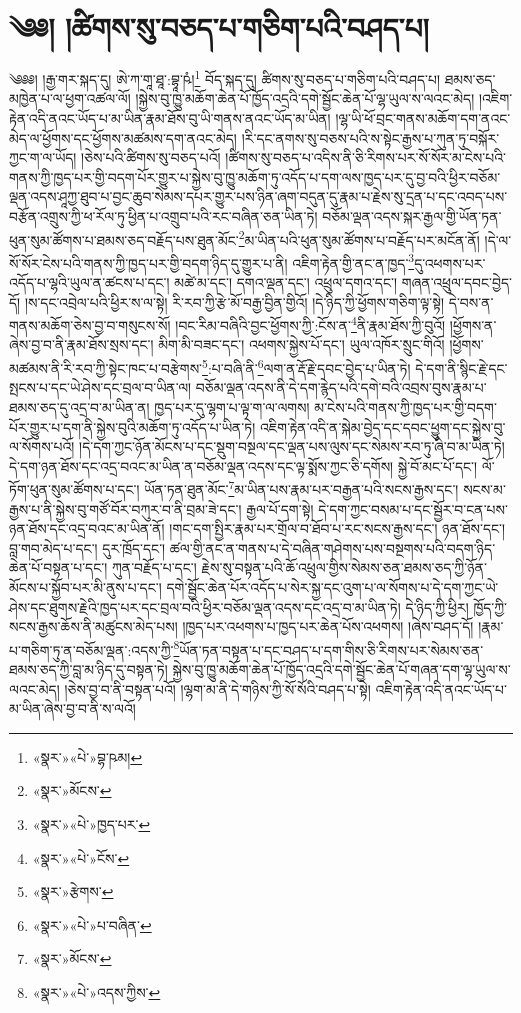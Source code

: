 \chapter{༄༅། །ཚིགས་སུ་བཅད་པ་གཅིག་པའི་བཤད་པ།}༄༅༅། །རྒྱ་གར་སྐད་དུ། ཨེ་ཀ་གཱ་ཐཱ་:བྷཱ་ཥཾ།\footnote{«སྣར་»«པེ་»བྷ་ཥམ།} བོད་སྐད་དུ། ཚིགས་སུ་བཅད་པ་གཅིག་པའི་བཤད་པ། ཐམས་ཅད་མཁྱེན་པ་ལ་ཕྱག་འཚལ་ལོ། །སྐྱེས་བུ་ཁྱུ་མཆོག་ཆེན་པོ་ཁྱོད་འདྲའི་དགེ་སྦྱོང་ཆེན་པོ་ལྷ་ཡུལ་ས་ལའང་མེད། །འཇིག་རྟེན་འདི་ནའང་ཡོད་པ་མ་ཡིན་རྣམ་ཐོས་བུ་ཡི་གནས་ནའང་ཡོད་མ་ཡིན། །ལྷ་ཡི་ཕོ་བྲང་གནས་མཆོག་དག་ནའང་མེད་ལ་ཕྱོགས་དང་ཕྱོགས་མཚམས་དག་ནའང་མེད། །རི་དང་ནགས་སུ་བཅས་པའི་ས་སྟེང་རྒྱས་པ་ཀུན་ཏུ་བསྐོར་ཀྱང་ག་ལ་ཡོད། །ཅེས་པའི་ཚིགས་སུ་བཅད་པའོ། །ཚིགས་སུ་བཅད་པ་འདིས་ནི་ཅི་རིགས་པར་སོ་སོར་མ་ངེས་པའི་གནས་ཀྱི་ཁྱད་པར་གྱི་བདག་པོར་གྱུར་པ་སྐྱེས་བུ་ཁྱུ་མཆོག་ཏུ་འདོད་པ་དག་ལས་ཁྱད་པར་དུ་བྱ་བའི་ཕྱིར་བཅོམ་ལྡན་འདས་ཤཱཀྱ་ཐུབ་པ་བྱང་ཆུབ་སེམས་དཔར་གྱུར་པས་ཉིན་ཞག་བདུན་དུ་རྣམ་པ་རྗེས་སུ་དྲན་པ་དང་འབད་པས་བརྩོན་འགྲུས་ཀྱི་ཕ་རོལ་ཏུ་ཕྱིན་པ་འགྲུབ་པའི་རང་བཞིན་ཅན་ཡིན་ཏེ། བཅོམ་ལྡན་འདས་སྐར་རྒྱལ་གྱི་ཡོན་ཏན་ཕུན་སུམ་ཚོགས་པ་ཐམས་ཅད་བརྗོད་པས་ཐུན་མོང་\footnote{«སྣར་»མོངས་}མ་ཡིན་པའི་ཕུན་སུམ་ཚོགས་པ་བརྗོད་པར་མངོན་ནོ། །དེ་ལ་སོ་སོར་ངེས་པའི་གནས་ཀྱི་ཁྱད་པར་གྱི་བདག་ཉིད་དུ་གྱུར་པ་ནི། འཇིག་རྟེན་གྱི་ནང་ན་ཁྱད་\footnote{«སྣར་»«པེ་»ཁྱད་པར་}དུ་འཕགས་པར་འདོད་པ་ལྷའི་ཡུལ་ན་ཚངས་པ་དང་། མཚེ་མ་དང་། དགའ་ལྡན་དང་། འཕྲུལ་དགའ་དང་། གཞན་འཕྲུལ་དབང་བྱེད་དོ། །ས་དང་འབྲེལ་པའི་ཕྱིར་ས་ལ་སྟེ། རི་རབ་ཀྱི་རྩེ་མོ་བརྒྱ་བྱིན་གྱིའོ། །དེ་ཉིད་ཀྱི་ཕྱོགས་གཅིག་ལྟ་སྟེ། དེ་བས་ན་གནས་མཆོག་ཅེས་བྱ་བ་གསུངས་སོ། །བང་རིམ་བཞིའི་བྱང་ཕྱོགས་ཀྱི་:ངོས་ན་\footnote{«སྣར་»«པེ་»ངོས་}ནི་རྣམ་ཐོས་ཀྱི་བུའོ། །ཕྱོགས་ན་ཞེས་བྱ་བ་ནི་རྣམ་ཐོས་སྲས་དང་། མིག་མི་བཟང་དང་། འཕགས་སྐྱེས་པོ་དང་། ཡུལ་འཁོར་སྲུང་གིའོ། །ཕྱོགས་མཚམས་ནི་རི་རབ་ཀྱི་སྟེང་ཁང་པ་བརྩེགས་\footnote{«སྣར་»རྩེགས་}:པ་བཞི་ནི་\footnote{«སྣར་»«པེ་»པ་བཞིན་}ལག་ན་རྡོ་རྗེ་དབང་བྱེད་པ་ཡིན་ཏེ། དེ་དག་ནི་སྙིང་རྗེ་དང་སྤངས་པ་དང་ཡེ་ཤེས་དང་བྲལ་བ་ཡིན་ལ། བཅོམ་ལྡན་འདས་ནི་དེ་དག་རྙེད་པའི་དགེ་བའི་འབྲས་བུས་རྣམ་པ་ཐམས་ཅད་དུ་འདྲ་བ་མ་ཡིན་ན། ཁྱད་པར་དུ་ལྷག་པ་ལྟ་ག་ལ་ལགས། མ་ངེས་པའི་གནས་ཀྱི་ཁྱད་པར་གྱི་བདག་པོར་གྱུར་པ་དག་ནི་སྐྱེས་བུའི་མཆོག་ཏུ་འདོད་པ་ཡིན་ཏེ། འཇིག་རྟེན་འདི་ན་སྐེམ་བྱེད་དང་དབང་ཕྱུག་དང་སྐྱེས་བུ་ལ་སོགས་པའོ། །དེ་དག་ཀྱང་ཉོན་མོངས་པ་དང་སྡུག་བསྔལ་དང་ལྡན་པས་ལུས་དང་སེམས་རབ་ཏུ་ཞི་བ་མ་ཡིན་ཏེ། དེ་དག་ཉན་ཐོས་དང་འདྲ་བའང་མ་ཡིན་ན་བཅོམ་ལྡན་འདས་དང་ལྟ་སྨོས་ཀྱང་ཅི་དགོས། སྐྱེ་བོ་མང་པོ་དང་། ལོ་ཏོག་ཕུན་སུམ་ཚོགས་པ་དང་། ཡོན་ཏན་ཐུན་མོང་\footnote{«སྣར་»མོངས་}མ་ཡིན་པས་རྣམ་པར་བརྒྱན་པའི་སངས་རྒྱས་དང་། སངས་མ་རྒྱས་པ་ནི་སྐྱེས་བུ་གཙོ་བོར་བཀུར་བ་ནི་བྲམ་ཟེ་དང་། རྒྱལ་པོ་དག་སྟེ། དེ་དག་ཀྱང་བསམ་པ་དང་སྦྱོར་བ་ངན་པས་ཉན་ཐོས་དང་འདྲ་བའང་མ་ཡིན་ནོ། །གང་དག་སྤྱིར་རྣམ་པར་གྲོལ་བ་ཐོབ་པ་རང་སངས་རྒྱས་དང་། ཉན་ཐོས་དང་། བླ་གབ་མེད་པ་དང་། དུར་ཁྲོད་དང་། ཚལ་གྱི་ནང་ན་གནས་པ་དེ་བཞིན་གཤེགས་པས་བསྔགས་པའི་བདག་ཉིད་ཆེན་པོ་བསྟན་པ་དང་། ཀུན་བརྗོད་པ་དང་། རྗེས་སུ་བསྟན་པའི་ཆོ་འཕྲུལ་གྱིས་སེམས་ཅན་ཐམས་ཅད་ཀྱི་ཉོན་མོངས་པ་སྐྱོབ་པར་མི་ནུས་པ་དང་། དགེ་སྦྱོང་ཆེན་པོར་འདོད་པ་སེར་སྐྱ་དང་འུག་པ་ལ་སོགས་པ་དེ་དག་ཀྱང་ཡེ་ཤེས་དང་ཐུགས་རྗེའི་ཁྱད་པར་དང་བྲལ་བའི་ཕྱིར་བཅོམ་ལྡན་འདས་དང་འདྲ་བ་མ་ཡིན་ཏེ། དེ་ཉིད་ཀྱི་ཕྱིར། ཁྱོད་ཀྱི་སངས་རྒྱས་ཆོས་ནི་མཚུངས་མེད་པས། །ཁྱད་པར་འཕགས་པ་ཁྱད་པར་ཆེན་པོས་འཕགས། །ཞེས་བཤད་དོ། །རྣམ་པ་གཅིག་ཏུ་ན་བཅོམ་ལྡན་:འདས་ཀྱི་\footnote{«སྣར་»«པེ་»འདས་ཀྱིས་}ཡོན་ཏན་བསྟན་པ་དང་བཤད་པ་དག་གིས་ཅི་རིགས་པར་སེམས་ཅན་ཐམས་ཅད་ཀྱི་བླ་མ་ཉིད་དུ་བསྟན་ཏེ། སྐྱེས་བུ་ཁྱུ་མཆོག་ཆེན་པོ་ཁྱོད་འདྲའི་དགེ་སྦྱོང་ཆེན་པོ་གཞན་དག་ལྷ་ཡུལ་ས་ལའང་མེད། །ཅེས་བྱ་བ་ནི་བསྟན་པའོ། །ལྷག་མ་ནི་དེ་གཉིས་ཀྱི་སོ་སོའི་བཤད་པ་སྟེ། འཇིག་རྟེན་འདི་ནའང་ཡོད་པ་མ་ཡིན་ཞེས་བྱ་བ་ནི་ས་ལའོ། 